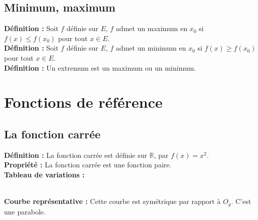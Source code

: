 \documentclass[a4paper,titlepage]{article}
\makeatletter
\let\oldsection\section
\renewcommand\section{\clearpage\oldsection}
\def\tikzscale{1}\begin{lrbox}{\measure@tikzpicture}
\edef\tikzscale{\pgfmathresult}
\makeatother
\begin{document}
    \subsection{Minimum, maximum}
        \textbf{Définition :} Soit $f$ définie sur $E$, $f$ admet un maximum en $x_{0}$ si $f\left(x\right)\leqslant f\left(x_{0}\right)$ pour tout $x\in E$.
        \\
        \textbf{Définition :} Soit $f$ définie sur $E$, $f$ admet un minimum en $x_{0}$ si $f\left(x\right)\geqslant f\left(x_{0}\right)$ pour tout $x\in E$.
        \\
        \textbf{Définition :} Un extremum est un maximum ou un minimum.
\section{Fonctions de référence}
    \subsection{La fonction carrée}
        \textbf{Définition :} La fonction carrée est définie sur $\mathbb{R}$, par $f\left(x\right)=x^{2}$.
        \\
        \textbf{Propriété :} La fonction carrée est une fonction paire.
        \\
        \textbf{Tableau de variations :}
        \\
        \begin{scaletikzpicturetowidth}{\textwidth}
        \end{scaletikzpicturetowidth}
        \\
        \textbf{Courbe représentative :} Cette courbe est symétrique par rapport à $O_{y}$. C’est une parabole.
        \\
        \begin{center}
        \end{center}
    \clearpage
\end{document}
